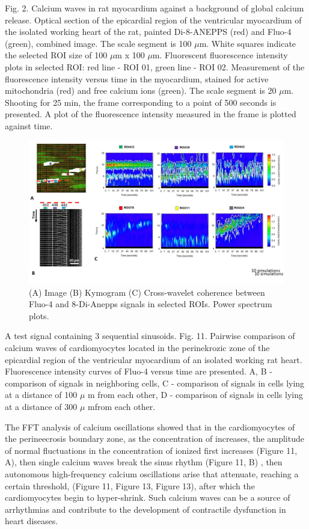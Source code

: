 \documentclass{biophys-new}
\begin{document}
Fig. 2.  Calcium waves in rat myocardium against a background of global calcium release.
Optical section of the epicardial region of the ventricular myocardium of the isolated working heart of the rat, painted Di-8-ANEPPS (red) and Fluo-4 (green), combined image.
The scale segment is 100 $\mu$m.
White squares indicate the selected ROI size of 100 $\mu$m x 100 $\mu$m.
Fluorescent fluorescence intensity plots in selected ROI: red line - ROI 01, green line - ROI 02.
Measurement of the fluorescence intensity versus time in the myocardium, stained for active mitochondria (red) and free calcium ions (green).
The scale segment is 20 $\mu$m. Shooting for 25 min, the frame corresponding to a point of 500 seconds is presented.
A plot of the fluorescence intensity measured in the frame is plotted against time.


\begin{figure}
    \includegraphics[width=0.9\linewidth]{fig8.jpg}
    \caption{(A) Image (B) Kymogram (C) Cross-wavelet coherence between Fluo-4 and 8-Di-Anepps signals in selected ROIs. Power spectrum plots. }
    \label{fig:fig8}
\end{figure}




A test signal containing 3 sequential sinusoids.
Fig. 11. Pairwise comparison of calcium waves of cardiomyocytes located in the perinekrozic zone of the epicardial region of the ventricular myocardium of an isolated working rat heart. Fluorescence intensity curves of Fluo-4 versus time are presented. A, B - comparison of signals in neighboring cells, C - comparison of signals in cells lying at a distance of 100 $\mu$ m from each other, D - comparison of signals in cells lying at a distance of 300 $\mu$  mfrom each other.


The FFT analysis of calcium oscillations showed that in the cardiomyocytes of the perineecrosis boundary zone, as the concentration of  increases, the amplitude of normal fluctuations in the concentration of ionized  first increases (Figure 11, A), then single calcium waves break the sinus rhythm (Figure 11, B) , then autonomous high-frequency calcium oscillations arise that attenuate, reaching a certain threshold, (Figure 11, Figure 13, Figure 13), after which the cardiomyocytes begin to hyper-shrink. Such calcium waves can be a source of arrhythmias and contribute to the development of contractile dysfunction in heart diseases.
\end{document}
